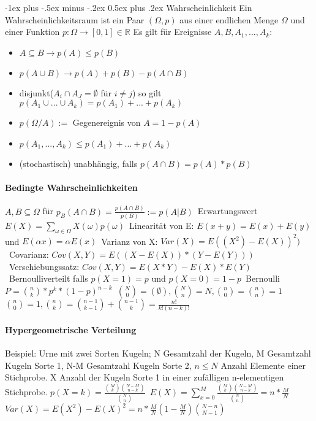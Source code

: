 \documentclass[10pt,landscape]{article}
\makeatletter
\renewcommand{\section}{\@startsection{section}{1}{0mm}%
                                {-1ex plus -.5ex minus -.2ex}%
                                {0.5ex plus .2ex}%
                                {\normalfont\large\bfseries}}
\makeatother
\begin{document}
\begin{multicols}{3}
\section{Wahrscheinlichkeit}
Ein Wahrscheinlichkeitsraum ist ein Paar $(\Omega, p)$ aus einer endlichen Menge $\Omega$ und einer Funktion $p:\Omega \rightarrow [0,1]\in \mathbb{R}$
Es gilt für Ereignisse $A,B,A_1,...,A_k$:
\begin{itemize}
    \item $A\subseteq B \rightarrow p(A)\leq p(B)$
    \item $p(A\cup B) \rightarrow p(A)+p(B)-p(A\cap B)$
    \item disjunkt($A_i \cap A_J=\emptyset$ für $i\not =j$) so gilt $p(A_1 \cup ... \cup A_k)= p(A_1)+...+p(A_k)$
    \item $p(\Omega / A):=$ Gegenereignis von $A=1-p(A)$
    \item $p(A_1,...,A_k) \leq p(A_1)+...+p(A_k)$
    \item (stochastisch) unabhängig, falls $p(A\cap B) = p(A)*p(B)$
\end{itemize}

\paragraph{Bedingte Wahrscheinlichkeiten}
$A,B\subseteq \Omega$ für $p_B(A\cap B)= \frac{p(A\cap B)}{p(B)}:= p(A|B)$\
Erwartungswert $E(X) = \sum_{\omega \in \Omega} X(\omega)p(\omega)$\
Linearität von E: $E(x+y)=E(x)+E(y)$ und $E(\alpha x)=\alpha E(x)$\
Varianz von X: $Var(X)=E((X^2)-E(X))^2)$\
Covarianz: $Cov(X,Y)=E((X-E(X))*(Y-E(Y)))$\
Verschiebungssatz: $Cov(X,Y)=E(X*Y)-E(X)*E(Y)$\
Bernoulliverteilt falls $p(X=1)=p$ und $p(X=0)=1-p$\
Bernoulli $P=\binom{n}{k}*p^k*(1-p)^{n-k}$\
$\binom{N}{0}=(\emptyset), \binom{N}{n}={N}, \binom{n}{0}=\binom{n}{n}=1$ $\binom{n}{0}=1, \binom{n}{k}=\binom{n-1}{k-1}+\binom{n-1}{k}=\frac{n!}{k!(n-k)!}$

\paragraph{Hypergeometrische Verteilung}
Beispiel: Urne mit zwei Sorten Kugeln; N Gesamtzahl der Kugeln, M Gesamtzahl Kugeln Sorte 1, N-M Gesamtzahl Kugeln Sorte 2, $n\leq N$ Anzahl Elemente einer Stichprobe. X Anzahl der Kugeln Sorte 1 in einer zufälligen n-elementigen Stichprobe.
$p(X=k)=\frac{\binom{M}{k}\binom{N-M}{n-k}}{\binom{N}{n}}$\
$E(X)=\sum_{x=0}^M \frac{\binom{M}{k}\binom{N-M}{n-k}}{\binom{N}{n}}=n*\frac{M}{N}$\
$Var(X)=E(X^2)-E(X)^2 = n*\frac{M}{N}(1-\frac{M}{N})\binom{N-n}{N-1}$


\end{multicols}
\end{document}
